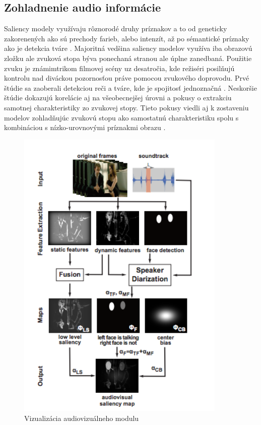 \subsection{Zohladnenie audio informácie}
Saliency modely využívaju rôznorodé druhy príznakov a to od geneticky zakorenených ako sú prechody farieb, alebo intenzít, až po sémantické príznaky ako je detekcia tváre \cite{salient-faces}.
Majoritná vedšina saliency modelov využíva iba obrazovú zložku ale zvuková stopa býva ponechaná stranou ale úplne zanedbaná.
Použitie zvuku je známimtrikom filmovej scény uz desatročia, kde režiséri posilňujú kontrolu nad diváckou pozornosťou práve pomocou zvukového doprovodu.
Prvé štúdie sa zaoberali detekciou reči a tváre, kde je spojitosť jednoznačná \cite{sound-1}.
Neskoršie štúdie dokazujú korelácie aj na všeobecnejšej úrovni a pokusy o extrakciu samotnej charakteristiky zo zvukovej stopy\cite{sound-coutrot-1}.
Tieto pokusy viedli aj k zostaveniu modelov zohladňujúc zvukovú stopu ako samostatnú charakteristiku spolu s kombináciou s nízko-urovnovými príznakmi obrazu \cite{sound-courot-2}.

\begin{figure}[H]
  \centering
  \includegraphics[width=10cm]{pics/courot-1.png}
  \caption{Vizualizácia audiovizuálneho modulu\cite{sound-courot-2}}\label{wrap-fig:4}
\end{figure}
\vspace{10mm}

